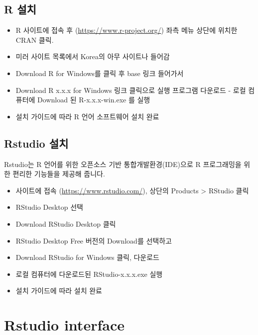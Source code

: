 \documentclass[
]{book}
\providecommand{\tightlist}{%
  \setlength{\itemsep}{0pt}\setlength{\parskip}{0pt}}
\begin{document}
\hypertarget{r-uxc124uxce58}{%
\subsection{R 설치}\label{r-uxc124uxce58}}

\begin{itemize}
\tightlist
\item
  R 사이트에 접속 후 (\url{https://www.r-project.org/}) 좌측 메뉴 상단에 위치한 CRAN 클릭.
\item
  미러 사이트 목록에서 Korea의 아무 사이트나 들어감
\item
  Download R for Windows를 클릭 후 base 링크 들어가서
\item
  Download R x.x.x for Windows 링크 클릭으로 실행 프로그램 다운로드 - 로컬 컴퓨터에 Download 된 R-x.x.x-win.exe 를 실행
\item
  설치 가이드에 따라 R 언어 소프트웨어 설치 완료
\end{itemize}

\hypertarget{rstudio-uxc124uxce58}{%
\subsection{Rstudio 설치}\label{rstudio-uxc124uxce58}}

Rstudio는 R 언어를 위한 오픈소스 기반 통합개발환경(IDE)으로 R 프로그래밍을 위한 편리한 기능들을 제공해 줍니다.

\begin{itemize}
\tightlist
\item
  사이트에 접속 (\url{https://www.rstudio.com/}), 상단의 Products \textgreater{} RStudio 클릭
\item
  RStudio Desktop 선택
\item
  Download RStudio Desktop 클릭
\item
  RStudio Desktop Free 버전의 Download를 선택하고
\item
  Download RStudio for Windows 클릭, 다운로드
\item
  로컬 컴퓨터에 다운로드된 RStudio-x.x.x.exe 실행
\item
  설치 가이드에 따라 설치 완료
\end{itemize}

\hypertarget{rstudio-interface}{%
\section{Rstudio interface}\label{rstudio-interface}}
\end{document}
